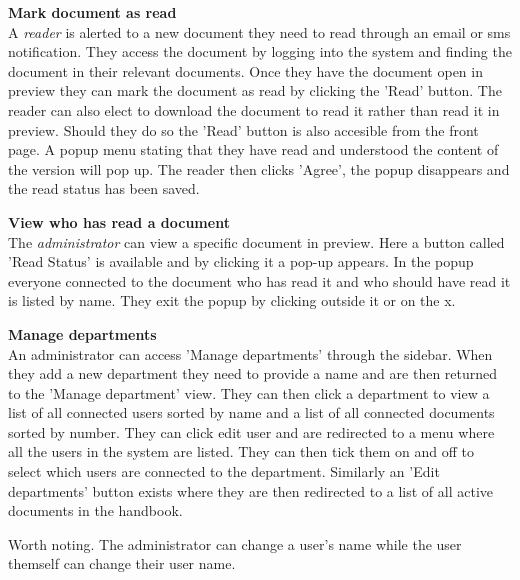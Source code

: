 \textbf{Mark document as read}
\\
A \textit{reader} is alerted to a new document they need to read through an email or sms notification.
They access the document by logging into the system and finding the document in their relevant documents.
Once they have the document open in preview they can mark the document as read by clicking the 'Read' button.
The reader can also elect to download the document to read it rather than read it in preview.
Should they do so the 'Read' button is also accesible from the front page.
A popup menu stating that they have read and understood the content of the version will pop up.
The reader then clicks 'Agree', the popup disappears and the read status has been saved.

\textbf{View who has read a document}
\\
The \textit{administrator} can view a specific document in preview.
Here a button called 'Read Status' is available and by clicking it a pop-up appears.
In the popup everyone connected to the document who has read it and who should have read it is listed by name.
They exit the popup by clicking outside it or on the x.

\textbf{Manage departments}
\\
An administrator can access 'Manage departments' through the sidebar.
When they add a new department they need to provide a name and are then returned to the 'Manage department' view.
They can then click a department to view a list of all connected users sorted by name and a list of all connected documents sorted by number.
They can click edit user and are redirected to a menu where all the users in the system are listed.
They can then tick them on and off to select which users are connected to the department.
Similarly an 'Edit departments' button exists where they are then redirected to a list of all active documents in the handbook.

Worth noting. The administrator can change a user's name while the user themself can change their user name.
